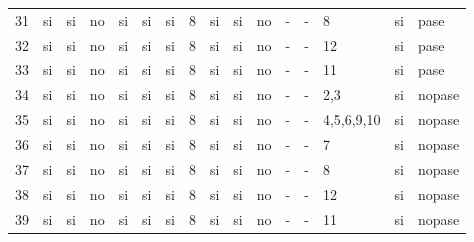 \documentclass[a4paper, 10pt, notitlepage]{article}
\begin{document}
\begin{landscape}
\begin{tabularx}{1.5\textheight}{|X|X|X|X|X|X|X|X|X|X|X|X|X|X|X|X|}
31	&	si	&	si	&	no	&	si	&	si	&	si	&	8	&	si	&	si	&	no	&	-	&	-	&	8	&	si	&	pase\\
32	&	si	&	si	&	no	&	si	&	si	&	si	&	8	&	si	&	si	&	no	&	-	&	-	&	12	&	si	&	pase\\
33	&	si	&	si	&	no	&	si	&	si	&	si	&	8	&	si	&	si	&	no	&	-	&	-	&	11	&	si	&	pase\\
34	&	si	&	si	&	no	&	si	&	si	&	si	&	8	&	si	&	si	&	no	&	-	&	-	&	2,3	&	si	&	nopase\\
35	&	si	&	si	&	no	&	si	&	si	&	si	&	8	&	si	&	si	&	no	&	-	&	-	&	4,5,6,9,10	&	si	&	nopase\\
36	&	si	&	si	&	no	&	si	&	si	&	si	&	8	&	si	&	si	&	no	&	-	&	-	&	7	&	si	&	nopase\\
37	&	si	&	si	&	no	&	si	&	si	&	si	&	8	&	si	&	si	&	no	&	-	&	-	&	8	&	si	&	nopase\\
38	&	si	&	si	&	no	&	si	&	si	&	si	&	8	&	si	&	si	&	no	&	-	&	-	&	12	&	si	&	nopase\\
39	&	si	&	si	&	no	&	si	&	si	&	si	&	8	&	si	&	si	&	no	&	-	&	-	&	11	&	si	&	nopase\\
\end{tabularx}
\vskip3cm

%		
\end{landscape}
	
\end{document}
